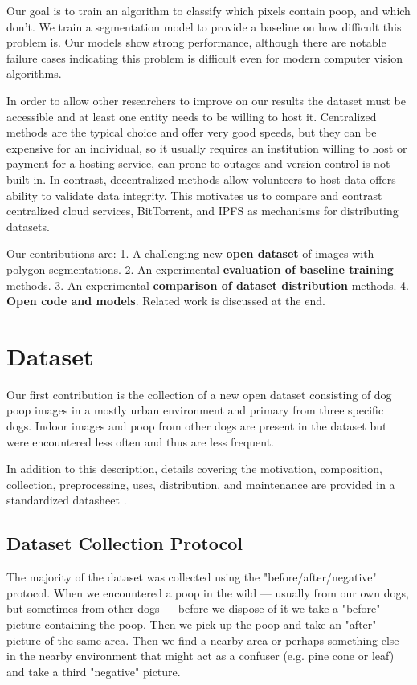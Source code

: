 \documentclass[10pt,twocolumn,letterpaper]{article}
\begin{document}
Our goal is to train an algorithm to classify which pixels contain poop, and
which don't. We train a segmentation model to provide a baseline on how
difficult this problem is. Our models show strong performance, although there
are notable failure cases indicating this problem is difficult even for modern
computer vision algorithms.

In order to allow other researchers to improve on our results the dataset must
be accessible and at least one entity needs to be willing to host it.
Centralized methods are the typical choice and offer very good speeds, 
but they can be expensive for an individual, so it usually requires an
institution willing to host or payment for a hosting service,
can prone to outages and version control is not built in.
In contrast, decentralized methods allow volunteers to host data offers ability
to validate data integrity. 
This motivates us to compare and contrast centralized cloud services,
BitTorrent, and IPFS as mechanisms for distributing datasets.



Our contributions are:
1. A challenging new \textbf{open dataset} of images with polygon segmentations.
2. An experimental \textbf{evaluation of baseline training} methods.
3. An experimental \textbf{comparison of dataset distribution} methods.
4. \textbf{Open code and models}.
Related work is discussed at the end.


\section{Dataset}

Our first contribution is the collection of a new open dataset consisting of
dog poop images in a mostly urban environment and primary from three specific
dogs. Indoor images and poop from other dogs are present in the dataset but
were encountered less often and thus are less frequent.

In addition to this description, details covering the motivation, composition,
collection, preprocessing, uses, distribution, and maintenance are provided in
a standardized datasheet \cite{gebru_datasheets_2021}.

\subsection{Dataset Collection Protocol}
The majority of the dataset was collected using the "before/after/negative"
protocol.
When we encountered a poop in the wild --- usually from our own dogs, but
sometimes from other dogs --- before we dispose of it we 
take a "before" picture containing the poop.
Then we pick up the poop and take an "after" picture of the same area. 
Then we find a nearby area or perhaps something else in the nearby environment
that might act as a confuser (e.g. pine cone or leaf) and take a third
"negative" picture.
\end{document}
